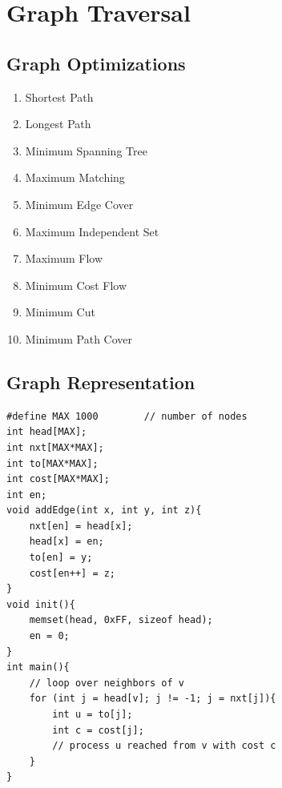 \documentclass[12pt]{book}
\begin{document}
\chapter{Graph Traversal}
\section{Graph Optimizations}
\begin{enumerate}[label = \roman*.]
\item Shortest Path
\item Longest Path
\item Minimum Spanning Tree
\item Maximum Matching
\item Minimum Edge Cover
\item Maximum Independent Set
\item Maximum Flow
\item Minimum Cost Flow
\item Minimum Cut
\item Minimum Path Cover
\end{enumerate}
\section{Graph Representation}
\begin{verbatim}
#define MAX 1000		// number of nodes
int head[MAX];
int nxt[MAX*MAX];
int to[MAX*MAX];
int cost[MAX*MAX];
int en;
void addEdge(int x, int y, int z){
	nxt[en] = head[x];
	head[x] = en;
	to[en] = y;
	cost[en++] = z;
}
void init(){
	memset(head, 0xFF, sizeof head);
	en = 0;
}
int main(){
	// loop over neighbors of v
	for (int j = head[v]; j != -1; j = nxt[j]){
		int u = to[j];
		int c = cost[j];
		// process u reached from v with cost c
	}
}
\end{verbatim}
\end{document}
